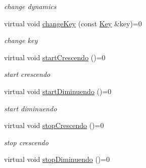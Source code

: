 \begin{DoxyCompactItemize}
\begin{DoxyCompactList}\small\item\em change dynamics \end{DoxyCompactList}\item 
\hypertarget{classsinsy_1_1IScoreWritable_aab1dfca13aebe9dbb2ed5a82d991ae71}{virtual void \hyperlink{classsinsy_1_1IScoreWritable_aab1dfca13aebe9dbb2ed5a82d991ae71}{change\-Key} (const \hyperlink{classsinsy_1_1Key}{\-Key} \&key)=0}\label{classsinsy_1_1IScoreWritable_aab1dfca13aebe9dbb2ed5a82d991ae71}

\begin{DoxyCompactList}\small\item\em change key \end{DoxyCompactList}\item 
\hypertarget{classsinsy_1_1IScoreWritable_afe63162fab1fc648b1401ea83791a840}{virtual void \hyperlink{classsinsy_1_1IScoreWritable_afe63162fab1fc648b1401ea83791a840}{start\-Crescendo} ()=0}\label{classsinsy_1_1IScoreWritable_afe63162fab1fc648b1401ea83791a840}

\begin{DoxyCompactList}\small\item\em start crescendo \end{DoxyCompactList}\item 
\hypertarget{classsinsy_1_1IScoreWritable_a32d8c5fd5e3bee214fb7fad3b72fc4de}{virtual void \hyperlink{classsinsy_1_1IScoreWritable_a32d8c5fd5e3bee214fb7fad3b72fc4de}{start\-Diminuendo} ()=0}\label{classsinsy_1_1IScoreWritable_a32d8c5fd5e3bee214fb7fad3b72fc4de}

\begin{DoxyCompactList}\small\item\em start diminuendo \end{DoxyCompactList}\item 
\hypertarget{classsinsy_1_1IScoreWritable_a5869fa4b213eb9208284a3b768c6f753}{virtual void \hyperlink{classsinsy_1_1IScoreWritable_a5869fa4b213eb9208284a3b768c6f753}{stop\-Crescendo} ()=0}\label{classsinsy_1_1IScoreWritable_a5869fa4b213eb9208284a3b768c6f753}

\begin{DoxyCompactList}\small\item\em stop crescendo \end{DoxyCompactList}\item 
\hypertarget{classsinsy_1_1IScoreWritable_a8557cc67898a47a73d884a8b7eb2ebf2}{virtual void \hyperlink{classsinsy_1_1IScoreWritable_a8557cc67898a47a73d884a8b7eb2ebf2}{stop\-Diminuendo} ()=0}\label{classsinsy_1_1IScoreWritable_a8557cc67898a47a73d884a8b7eb2ebf2}


\end{DoxyCompactItemize}
